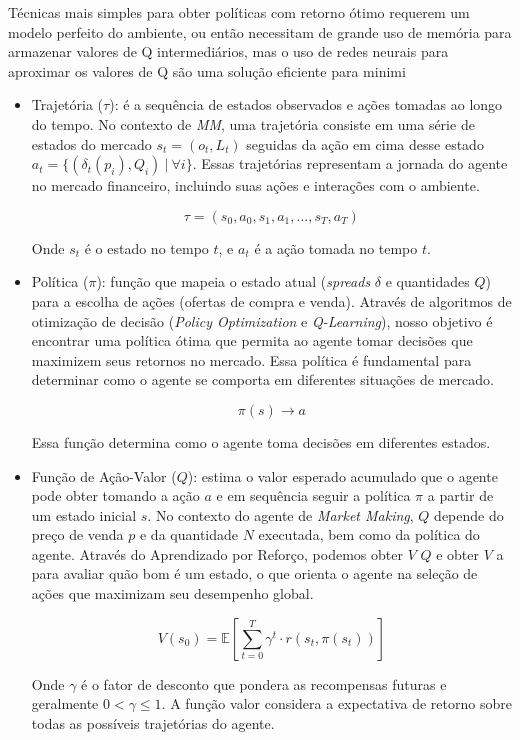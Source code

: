 Técnicas mais simples para obter políticas com retorno ótimo requerem um modelo perfeito do ambiente, ou então necessitam de grande uso de memória para armazenar valores de Q intermediários, mas o uso de redes neurais para aproximar os valores de Q são uma solução eficiente para minimi

\begin{itemize}
	\item Trajetória ($\tau$): é a sequência de estados observados e ações tomadas ao longo do tempo. No contexto de \textit{MM}, uma trajetória consiste em uma série de estados do mercado $s_{t} = (o_{t}, L_{t})$ seguidas da ação em cima desse estado $a_{t} = \{(\delta_{t}(p_{i}), Q_{i}) \ | \ \forall i \}$. Essas trajetórias representam a jornada do agente no mercado financeiro, incluindo suas ações e interações com o ambiente.
	
	\[
	\tau = (s_0, a_0, s_1, a_1, \ldots, s_T, a_T)
	\]
	
	Onde \(s_t\) é o estado no tempo \(t\), e \(a_t\) é a ação tomada no tempo \(t\).
	
	\item Política ($\pi$): função que mapeia o estado atual (\textit{spreads} $\delta$ e quantidades $Q$) para a escolha de ações (ofertas de compra e venda). Através de algoritmos de otimização de decisão (\textit{Policy Optimization} e \textit{Q-Learning}), nosso objetivo é encontrar uma política ótima que permita ao agente tomar decisões que maximizem seus retornos no mercado. Essa política é fundamental para determinar como o agente se comporta em diferentes situações de mercado.
	
	\[
	\pi(s) \rightarrow a
	\]
	
	Essa função determina como o agente toma decisões em diferentes estados.
	
	\item Função de Ação-Valor ($Q$): estima o valor esperado acumulado que o agente pode obter tomando a ação $a$ e em sequência seguir a política \(\pi\) a partir de um estado inicial $s$. No contexto do agente de \textit{Market Making}, $Q$ depende do preço de venda $p$ e da quantidade $N$ executada, bem como da política do agente. Através do Aprendizado por Reforço, podemos obter $V$ \(Q\) e obter $V$ a  para avaliar quão bom é um estado, o que orienta o agente na seleção de ações que maximizam seu desempenho global.
	
	\begin{equation*}
		V(s_0) = \mathbb{E}\left[\sum_{t=0}^{T} \gamma^t \cdot r(s_t, \pi(s_t)) \right]
		\end{equation*}
	
	Onde $\gamma$ é o fator de desconto que pondera as recompensas futuras e geralmente $0 < \gamma \leq 1$. A função valor considera a expectativa de retorno sobre todas as possíveis trajetórias do agente.
\end{itemize}

